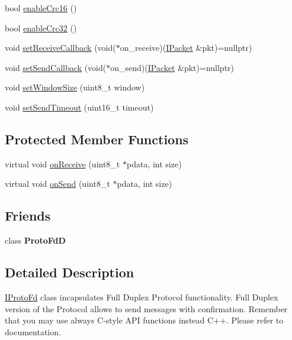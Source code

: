 \begin{DoxyCompactItemize}
\item 
bool \hyperlink{classTiny_1_1IProtoFd_a8b57afdb66434aa35409af34b04e1db9}{enable\+Crc16} ()
\item 
bool \hyperlink{classTiny_1_1IProtoFd_a1bf1f5211ae3a49caf73ee3de3bb9247}{enable\+Crc32} ()
\item 
void \hyperlink{classTiny_1_1IProtoFd_a70aa7c85b5fe83513eebb63b803d5825}{set\+Receive\+Callback} (void($\ast$on\+\_\+receive)(\hyperlink{classTiny_1_1IPacket}{I\+Packet} \&pkt)=nullptr)
\item 
void \hyperlink{classTiny_1_1IProtoFd_ac3c8efc9a30ab547c5d575a8de0ef1e5}{set\+Send\+Callback} (void($\ast$on\+\_\+send)(\hyperlink{classTiny_1_1IPacket}{I\+Packet} \&pkt)=nullptr)
\item 
void \hyperlink{classTiny_1_1IProtoFd_adddcc24bf1ef40d39c944679a97c1ec4}{set\+Window\+Size} (uint8\+\_\+t window)
\item 
void \hyperlink{classTiny_1_1IProtoFd_a2492655abda41d5b0fbda6f0e1c6badc}{set\+Send\+Timeout} (uint16\+\_\+t timeout)
\end{DoxyCompactItemize}
\subsection*{Protected Member Functions}
\begin{DoxyCompactItemize}
\item 
virtual void \hyperlink{classTiny_1_1IProtoFd_a795b41c969708964cd4646580af1c3ab}{on\+Receive} (uint8\+\_\+t $\ast$pdata, int size)
\item 
virtual void \hyperlink{classTiny_1_1IProtoFd_acd324920c1f35d378fb5153b51cd6561}{on\+Send} (uint8\+\_\+t $\ast$pdata, int size)
\end{DoxyCompactItemize}
\subsection*{Friends}
\begin{DoxyCompactItemize}
\item 
\mbox{\label{classTiny_1_1IProtoFd_ac4b680549c66e93cb1996fadcf86d724}} 
class {\bfseries Proto\+FdD}
\end{DoxyCompactItemize}


\subsection{Detailed Description}
\hyperlink{classTiny_1_1IProtoFd}{I\+Proto\+Fd} class incapsulates Full Duplex Protocol functionality. Full Duplex version of the Protocol allows to send messages with confirmation. Remember that you may use always C-\/style A\+PI functions instead C++. Please refer to documentation. 


